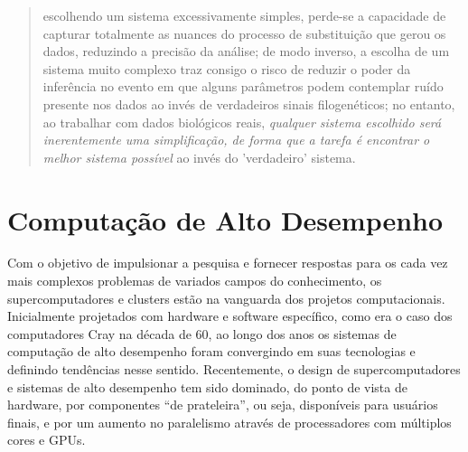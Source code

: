 \documentclass[english,brazilian]{UNISINOSmonografia} %
\begin{document}
\begin{quote}
	escolhendo um sistema excessivamente simples, perde-se a capacidade de capturar totalmente as nuances do processo de substituição que gerou os dados, reduzindo a precisão da análise;
	de modo inverso, a escolha de um sistema muito complexo traz consigo o risco de reduzir o poder da inferência no evento em que alguns parâmetros podem contemplar ruído presente nos dados ao invés de verdadeiros sinais filogenéticos;
	no entanto, ao trabalhar com dados biológicos reais, \emph{qualquer sistema escolhido será inerentemente uma simplificação, de forma que a tarefa é encontrar o melhor sistema possível} ao invés do 'verdadeiro' sistema.
\end{quote}






\section{Computação de Alto Desempenho}
\label{sec:computacao}




Com o objetivo de impulsionar a pesquisa e fornecer respostas para os cada vez mais complexos problemas de variados campos do conhecimento, os supercomputadores e clusters estão na vanguarda dos projetos computacionais.
Inicialmente projetados com hardware e software específico, como era o caso dos computadores Cray na década de 60, ao longo dos anos os sistemas de computação de alto desempenho foram convergindo em suas tecnologias e definindo tendências nesse sentido.
Recentemente, o design de supercomputadores e sistemas de alto desempenho tem sido dominado, do ponto de vista de hardware, por componentes ``de prateleira'', ou seja, disponíveis para usuários finais, e por um aumento no paralelismo através de processadores com múltiplos cores e GPUs.
\end{document}
